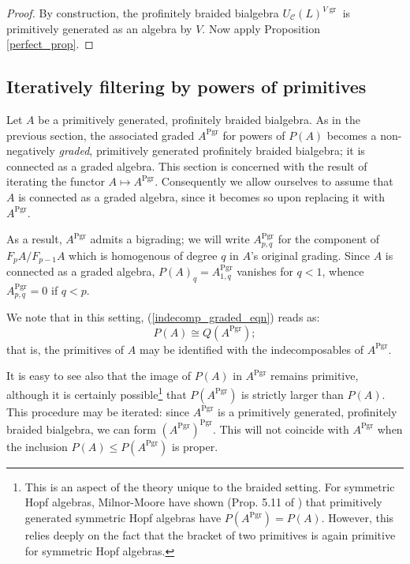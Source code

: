 \documentclass[12pt]{article}
\DeclareMathOperator{\Pgr}{Pgr}
\DeclareMathOperator{\gr}{gr}
\newcommand{\CC} {\mathcal{C}}
\theoremstyle{plain}
\theoremstyle{definition}
\theoremstyle{remark}
\begin{document}
\begin{proof}

By construction, the profinitely braided bialgebra $U_{\CC}(L)^{V\gr}$ is primitively generated as an algebra by $V$.  Now apply Proposition \ref{perfect_prop}.

\end{proof}


\subsection{Iteratively filtering by powers of primitives} \label{iter_P_sec}

Let $A$ be a primitively generated, profinitely braided bialgebra.  As in the previous section, the associated graded $A^{\Pgr}$ for powers of $P(A)$ becomes a non-negatively \emph{graded}, primitively generated profinitely braided bialgebra; it is connected as a graded algebra.  This section is concerned with the result of iterating the functor $A \mapsto A^{\Pgr}$.  Consequently we allow ourselves to assume that $A$ is connected as a graded algebra, since it becomes so upon replacing it with $A^{\Pgr}$.  

As a result, $A^{\Pgr}$ admits a bigrading; we will write $A^{\Pgr}_{p, q}$ for the component of $F_p A / F_{p-1} A$ which is homogenous of degree $q$ in $A$'s original grading.  Since $A$ is connected as a graded algebra, $P(A)_q = A^{\Pgr}_{1, q}$ vanishes for $q<1$, whence $A^{\Pgr}_{p, q} = 0$ if $q<p$.

We note that in this setting, (\ref{indecomp_graded_eqn}) reads as:
%
$$P(A) \cong Q(A^{\Pgr});$$ 
%
that is, the primitives of $A$ may be identified with the indecomposables of $A^{\Pgr}$.

It is easy to see also that the image of $P(A)$ in $A^{\Pgr}$ remains primitive, although it is certainly possible\footnote{This is an aspect of the theory unique to the braided setting.  For symmetric Hopf algebras, Milnor-Moore have shown (Prop. 5.11 of \cite{milnor-moore}) that primitively generated symmetric Hopf algebras have $P(A^{\Pgr}) = P(A)$.  However, this relies deeply on the fact that the bracket of two primitives is again primitive for symmetric Hopf algebras.}
 that $P(A^{\Pgr})$ is strictly larger than $P(A)$.  This procedure may be iterated: since $A^{\Pgr}$ is a primitively generated, profinitely braided bialgebra, we can form $(A^{\Pgr})^{\Pgr}$.  This will not coincide with $A^{\Pgr}$ when the inclusion $P(A) \leq P(A^{\Pgr})$ is proper.
\end{document}
